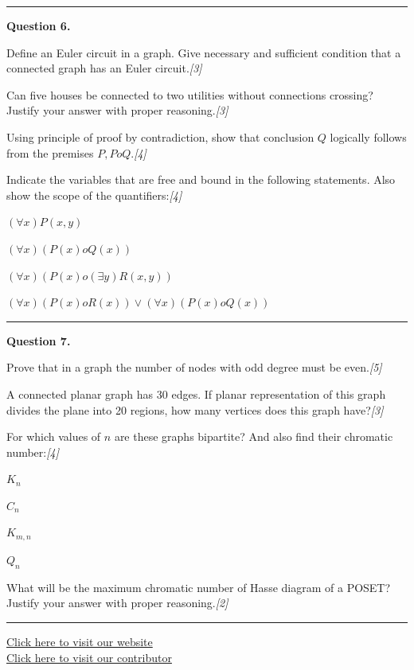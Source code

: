 \documentclass[11pt,a4paper]{article}
\newcommand{\pts}[1]{\hfill   \textit{[#1]}}
\begin{document}
\medskip\rule{\linewidth}{0.2pt}\medskip




\noindent   \textbf{Question 6.}

\begin{parts}
  \item Define an Euler circuit in a graph. Give necessary and sufficient condition that a connected graph has an Euler circuit.\pts{3}
  \item Can five houses be connected to two utilities without connections crossing? Justify your answer with proper reasoning.\pts{3}
  \item Using principle of proof by contradiction, show that conclusion $Q$ logically follows from the premises $P, P  o Q$.\pts{4}
  \item Indicate the variables that are free and bound in the following statements. Also show the scope of the quantifiers:\pts{4}
  
\begin{parts}
    \item $(\forall x)P(x, y)$
    \item $(\forall x)(P(x)  o Q(x))$
    \item $(\forall x)(P(x)  o (\exists y)R(x, y))$
    \item $(\forall x)(P(x)  o R(x)) \lor (\forall x)(P(x)  o Q(x))$
  \end{parts}
\end{parts}

\medskip\rule{\linewidth}{0.2pt}\medskip




\noindent   \textbf{Question 7.}

\begin{parts}
  \item Prove that in a graph the number of nodes with odd degree must be even.\pts{5}
  \item A connected planar graph has 30 edges. If planar representation of this graph divides the plane into 20 regions, how many vertices does this graph have?\pts{3}
  \item For which values of $n$ are these graphs bipartite? And also find their chromatic number:\pts{4}
  
\begin{parts}
    \item $K_n$
    \item $C_n$
    \item $K_{m,n}$
    \item $Q_n$
  \end{parts}
  \item What will be the maximum chromatic number of Hasse diagram of a POSET? Justify your answer with proper reasoning.\pts{2}
\end{parts}

\vfill
\rule{\linewidth}{0.4pt}

\begin{center}\small
\href{https://bhu-exam.vercel.app/}{Click here to visit our website}\\[4pt]
\href{https://me-aryan.vercel.app/}{Click here to visit our contributor}
\end{center}
\end{document}
